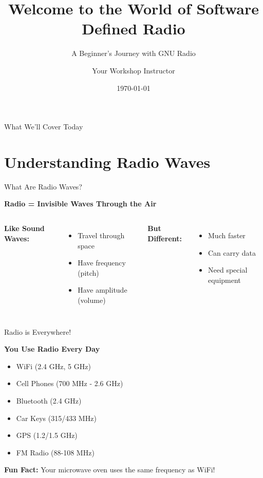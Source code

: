 \documentclass[aspectratio=169,12pt]{beamer}
\title{Welcome to the World of Software Defined Radio}
\subtitle{A Beginner's Journey with GNU Radio}
\author[Instructor]{Your Workshop Instructor}
\institute[GRCon]{GNU Radio Conference 2025}
\date{\today}
\begin{document}
\begin{frame}
\titlepage
\end{frame}

\begin{frame}{What We'll Cover Today}
\tableofcontents
\end{frame}

\section{Understanding Radio Waves}

\begin{frame}{What Are Radio Waves?}
\begin{center}
\Large\textbf{Radio = Invisible Waves Through the Air}
\end{center}
\vspace{1em}

\begin{columns}
\textbf{Like Sound Waves:}
\begin{itemize}
    \item Travel through space
    \item Have frequency (pitch)
    \item Have amplitude (volume)
\end{itemize}

\textbf{But Different:}
\begin{itemize}
    \item Much faster
    \item Can carry data
    \item Need special equipment
\end{itemize}
\end{columns}
\end{frame}

\begin{frame}{Radio is Everywhere!}
\begin{center}
\Large\textbf{You Use Radio Every Day}
\end{center}
\vspace{1em}

\begin{itemize}
    \item WiFi (2.4 GHz, 5 GHz)
    \item Cell Phones (700 MHz - 2.6 GHz)
    \item Bluetooth (2.4 GHz)
    \item Car Keys (315/433 MHz)
    \item GPS (1.2/1.5 GHz)
    \item FM Radio (88-108 MHz)
\end{itemize}

\vspace{1em}
\begin{center}
\colorbox{yellow!20}{\parbox{0.8\textwidth}{\centering
\textbf{Fun Fact:} Your microwave oven uses the same frequency as WiFi!}}
\end{center}
\end{frame}
\end{document}
